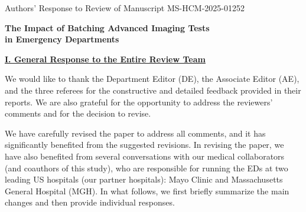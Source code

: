 \documentclass[11pt]{article}
\newcommand{\1}{\hbox{\rm 1\kern-.35em 1}}
\begin{document}
\setlength{\parindent}{0pt}
\pagestyle{fancy}
\fancyhead{}
\renewcommand{\headrulewidth}{0.0pt}

\begin{center}
{Authors' Response to Review of Manuscript MS-HCM-2025-01252}

\vspace{1mm}
\Large
\textbf{The Impact of Batching Advanced Imaging Tests\\ in Emergency Departments}
\vspace{1mm}

\end{center}
 \normalsize
\baselineskip=16pt
\noindent\underline{\textbf{I. General Response to the Entire Review Team}}

\noindent We would like to thank the Department Editor (DE), the Associate Editor (AE), and the three referees for the constructive and detailed feedback provided in their reports. We are also grateful for the opportunity to address the reviewers' comments and for the decision to revise.

We have carefully revised the paper to address all comments, and it has significantly benefited from the suggested revisions. In revising the paper, we have also benefited from several conversations with our medical collaborators (and coauthors of this study), who are responsible for running the EDs at two leading US hospitals (our partner hospitals): Mayo Clinic and Massachusetts General Hospital (MGH). In what follows, we first briefly summarize the main changes and then provide individual responses.
\end{document}
